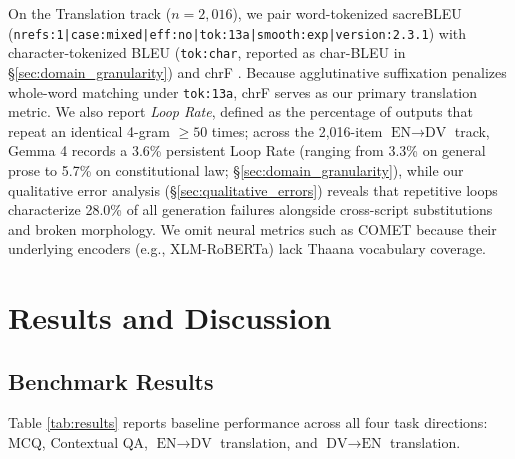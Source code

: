 \documentclass[acmsmall,review,anonymous]{acmart}
\begin{document}
On the Translation track ($n=2,016$), we pair word-tokenized sacreBLEU \cite{post_call_2018} (\texttt{nrefs:1|\allowbreak case:mixed|\allowbreak eff:no|\allowbreak tok:13a|\allowbreak smooth:exp|\allowbreak version:2.3.1}) with character-tokenized BLEU (\texttt{tok:char}, reported as char-BLEU in \S\ref{sec:domain_granularity}) and chrF \cite{popovic_chrf_2015}. Because agglutinative suffixation penalizes whole-word matching under \texttt{tok:13a}, chrF serves as our primary translation metric. We also report \textit{Loop Rate}, defined as the percentage of outputs that repeat an identical 4-gram $\geq50$ times; across the 2,016-item $\text{EN}\rightarrow\text{DV}$ track, Gemma 4 records a 3.6\% persistent Loop Rate (ranging from 3.3\% on general prose to 5.7\% on constitutional law; \S\ref{sec:domain_granularity}), while our qualitative error analysis (\S\ref{sec:qualitative_errors}) reveals that repetitive loops characterize 28.0\% of all generation failures alongside cross-script substitutions and broken morphology. We omit neural metrics such as COMET \cite{rei_comet_2020} because their underlying encoders (e.g., XLM-RoBERTa) lack Thaana vocabulary coverage.

\section{Results and Discussion}

\subsection{Benchmark Results}
Table \ref{tab:results} reports baseline performance across all four task directions: MCQ, Contextual QA, $\text{EN}\rightarrow\text{DV}$ translation, and $\text{DV}\rightarrow\text{EN}$ translation.
\end{document}
